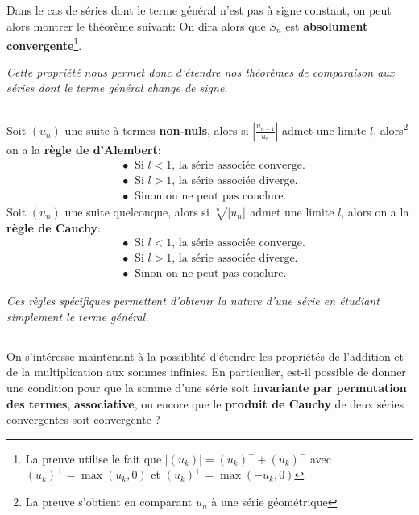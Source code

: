 \subsection*{}
Dans le cas de séries dont le terme général n'est pas à signe constant, on peut alors montrer le théorème suivant:
On dira alors que \(S_n\) est \textbf{absolument convergente}\footnote[4]{La preuve utilise le fait que \(|(u_k)| = (u_k)^+ + (u_k)^-\) avec \((u_k)^+ = \max(u_k, 0)\) et \((u_k)^+ = \max(-u_k, 0)\)}.
\begin{center}
   \textit{Cette propriété nous permet donc d'étendre nos théorèmes de comparaison aux séries dont le terme général change de signe.}
\end{center}
\subsection*{}
Soit \((u_n)\) une suite à termes \textbf{non-nuls}, alors si \(|\frac{u_{n+1}}{u_n}|\) admet une limite \(l\), alors\footnote[5]{\label{1}La preuve s'obtient en comparant \(u_n\) à une série géométrique} on a la \textbf{règle de d'Alembert}:
\begin{align*}
   &\bullet \;\; \text{Si \(l < 1\), la série associée converge.} \\
   &\bullet \;\; \text{Si \(l > 1\), la série associée diverge.} \\
   &\bullet \;\; \text{Sinon on ne peut pas conclure.}
\end{align*}
Soit \((u_n)\) une suite quelconque, alors si \(\sqrt[n]{|u_{n}|}\) admet une limite \(l\), alors on a la \textbf{règle de Cauchy}:
\begin{align*}
   &\bullet \;\; \text{Si \(l < 1\), la série associée converge.} \\
   &\bullet \;\; \text{Si \(l > 1\), la série associée diverge.} \\
   &\bullet \;\; \text{Sinon on ne peut pas conclure.}
\end{align*}
\begin{center}
   \textit{Ces règles spécifiques permettent d'obtenir la nature d'une série en étudiant simplement le terme général.}
\end{center}

\pagebreak
\subsection*{}
On s'intéresse maintenant à la possiblité d'étendre les propriétés de l'addition et de la multiplication aux sommes infinies. En particulier, est-il possible de donner une condition pour que la somme d'une série soit \textbf{invariante par permutation des termes}, \textbf{associative}, ou encore que le \textbf{produit de Cauchy} de deux séries convergentes soit convergente ?\<

